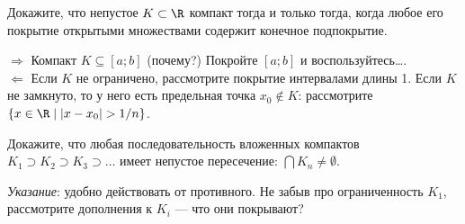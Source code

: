\documentclass[a4paper, 12pt, num=2729, date=01.09.2020]{listok}
\begin{document}
\begin{problem}
    Докажите, что непустое $K \subset \R$ компакт тогда и только тогда, когда любое его покрытие открытыми множествами содержит конечное подпокрытие. \\
\end{problem}
\begin{note}
    $\Rightarrow$ Компакт $K \subseteq [a;b]$ (почему?) Покройте $[a;b]$ и воспользуйтесь\ldots. \\
    $\Leftarrow$ Если $K$ не ограничено, рассмотрите покрытие интервалами длины 1. 
    Если $K$ не замкнуто, то у него есть предельная точка $x_0 \notin K$: рассмотрите $\{x \in \R \mid |x - x_0| > 1/n\}$. 
\end{note}

\begin{problem}
    Докажите, что любая последовательность вложенных компактов $K_1 \supset K_2 \supset K_3 \supset \ldots$
    имеет непустое пересечение: $\bigcap K_n \ne \emptyset$. \\
\end{problem}
\begin{note}
    \emph{Указание}: удобно действовать от противного. Не забыв про ограниченность $K_1$, рассмотрите дополнения к $K_i$ --- что они покрывают?
\end{note}
\end{document}
